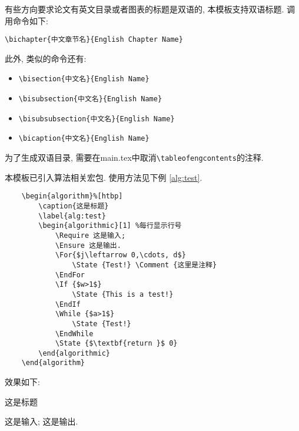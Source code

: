 有些方向要求论文有英文目录或者图表的标题是双语的, 本模板支持双语标题. 调用命令如下:
\begin{verbatim}
\bichapter{中文章节名}{English Chapter Name}
\end{verbatim}
此外, 类似的命令还有: 
\begin{itemize}
\item \verb|\bisection{中文名}{English Name}|
\item \verb|\bisubsection{中文名}{English Name}|
\item \verb|\bisubsubsection{中文名}{English Name}|
\item \verb|\bicaption{中文名}{English Name}|
\end{itemize}

为了生成双语目录, 需要在main.tex中取消\verb|\tableofengcontents|的注释.

本模板已引入算法相关宏包. 使用方法见下例 \ref{alg:test}.
\begin{verbatim}
    \begin{algorithm}%[htbp]
        \caption{这是标题}
        \label{alg:test}
        \begin{algorithmic}[1] %每行显示行号
            \Require 这是输入;
            \Ensure 这是输出.
            \For{$j\leftarrow 0,\cdots, d$}
                \State {Test!} \Comment {这里是注释}
            \EndFor
            \If {$w>1$}
                \State {This is a test!}
            \EndIf
            \While {$a>1$}
                \State {Test!}
            \EndWhile
            \State {$\textbf{return }$ 0}
        \end{algorithmic}
    \end{algorithm}
\end{verbatim}

效果如下:
\begin{algorithm}%
    \caption{这是标题}
    \label{alg:test}
    \begin{algorithmic}[1] %
        \Require 这是输入;
        \Ensure 这是输出.
             
        \EndFor
        \EndIf
        \EndWhile
    \end{algorithmic}
\end{algorithm}


